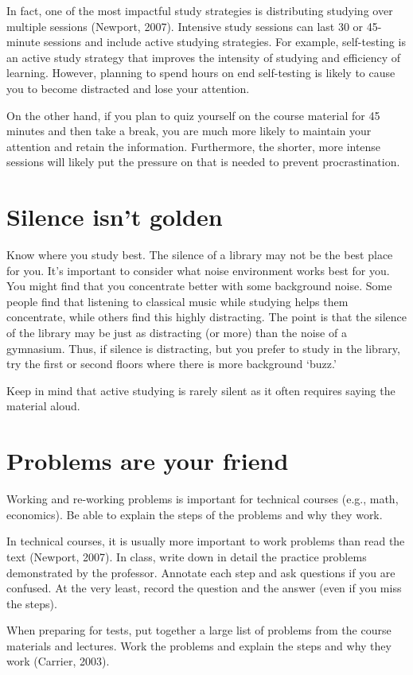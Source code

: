 \documentclass[../main.tex]{subfiles}
\begin{document}
In fact, one of the most impactful study strategies is distributing studying
over multiple sessions (Newport, 2007). Intensive study sessions can last 30 or
45-minute sessions and include active studying strategies. For example,
self-testing is an active study strategy that improves the intensity of studying
and efficiency of learning. However, planning to spend hours on end self-testing
is likely to cause you to become distracted and lose your attention.

On the other hand, if you plan to quiz yourself on the course material for 45
minutes and then take a break, you are much more likely to maintain your
attention and retain the information. Furthermore, the shorter, more intense
sessions will likely put the pressure on that is needed to prevent
procrastination.
%
\section{Silence isn't golden}
Know where you study best. The silence of a library may not be the best place
for you. It's important to consider what noise environment works best for you.
You might find that you concentrate better with some background noise. Some
people find that listening to classical music while studying helps them
concentrate, while others find this highly distracting. The point is that the
silence of the library may be just as distracting (or more) than the noise of a
gymnasium. Thus, if silence is distracting, but you prefer to study in the
library, try the first or second floors where there is more background ‘buzz.'

Keep in mind that active studying is rarely silent as it often requires saying
the material aloud.
%
\section{Problems are your friend}
Working and re-working problems is important for technical courses (e.g., math,
economics). Be able to explain the steps of the problems and why they work.

In technical courses, it is usually more important to work problems than read
the text (Newport, 2007). In class, write down in detail the practice problems
demonstrated by the professor. Annotate each step and ask questions if you are
confused. At the very least, record the question and the answer (even if you
miss the steps).

When preparing for tests, put together a large list of problems from the course
materials and lectures. Work the problems and explain the steps and why they
work (Carrier, 2003).
%
\end{document}
